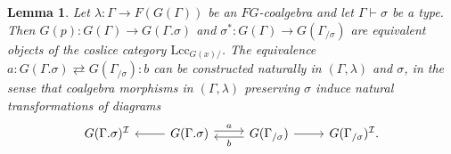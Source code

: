 \documentclass[a4paper]{article}
\newtheorem{lemma}[theorem]{Lemma}
\theoremstyle{remark}
\theoremstyle{definition}
\begin{document}
\begin{lemma}
  \label{lem:extension-vs-slice}
  Let $\lambda : \Gamma \rightarrow F(G(\Gamma))$ be an $FG$-coalgebra and let $\Gamma \vdash \sigma$ be a type.
  Then $G(p) : G(\Gamma) \rightarrow G(\Gamma.\sigma)$ and $\sigma^* : G(\Gamma) \rightarrow G(\Gamma_{/ \sigma})$ are equivalent objects of the coslice category $\mathrm{Lcc}_{G(x) /}$.
  The equivalence $a : G(\Gamma.\sigma) \rightleftarrows G(\Gamma_{/ \sigma}) : b$ can be constructed naturally in $(\Gamma, \lambda)$ and $\sigma$, in the sense that coalgebra morphisms in $(\Gamma, \lambda)$ preserving $\sigma$ induce natural transformations of diagrams
  \begin{equation}
    \label{eq:ext-equivalence}
    \begin{tikzcd}
      G(\Gamma.\sigma)^\mathcal{I} & G(\Gamma.\sigma) \arrow[r, shift left, "a"] \arrow[l] & G(\Gamma_{/ \sigma}) \arrow[l, shift left, "b"] \arrow[r] & G(\Gamma_{/ \sigma})^\mathcal{I}.
    \end{tikzcd}
  \end{equation}
\end{lemma}
\end{document}
